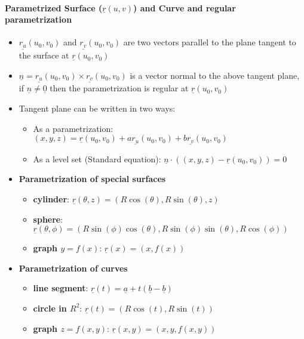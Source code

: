 \documentclass[8pt, twocolumn]{article}
\begin{document}
\paragraph{Parametrized Surface ($\underline{r}(u, v)$) and Curve and regular parametrization}
\begin{itemize}
	\item $\underline{r_u}(u_0, v_0)$ and $\underline{r_v}(u_0, v_0)$ are two vectors parallel to the plane tangent to the surface at $\underline{r}(u_0, v_0)$
	\item  $\underline{n} =\underline{r_u}(u_0, v_0) \times \underline{r_v}(u_0, v_0)$ is a vector normal to the above tangent plane, if $\underline{n} \neq \underline{0}$ then the parametrization is regular at $\underline{r}(u_0, v_0)$
	\item Tangent plane can be written in two ways: 
	\begin{itemize}
		\item As a parametrization: $(x, y, z) = \underline{r}(u_0, v_0) + a\underline{r_u}(u_0, v_0) + b\underline{r_v}(u_0, v_0)$
		\item As a level set (Standard equation): $\underline{n} \cdot ((x, y, z) - \underline{r}(u_0, v_0)) = 0$
	\end{itemize}	
	\item \textbf{Parametrization of special surfaces}	
	\begin{itemize}
		\item \textbf{cylinder}: $\underline{r}(\theta, z) = (R\cos(\theta), R\sin(\theta), z)$
		\item \textbf{sphere}: $\underline{r}(\theta, \phi) = (R\sin(\phi)\cos(\theta), R\sin(\phi)\sin(\theta), R\cos(\phi))$
		\item \textbf{graph $y = f(x)$}: $\underline{r}(x) = (x, f(x))$
	\end{itemize}
	\item \textbf{Parametrization of curves}	
	\begin{itemize}
		\item \textbf{line segment}: $\underline{r}(t) = \underline{a} + t(\underline{b} - \underline{b})$
		\item \textbf{circle in $R^2$}: $\underline{r}(t) = (R\cos(t), R\sin(t))$
		\item \textbf{graph $z = f(x, y)$}: $\underline{r}(x, y) = (x, y, f(x, y))$
	\end{itemize}

\end{itemize}
\end{document}
